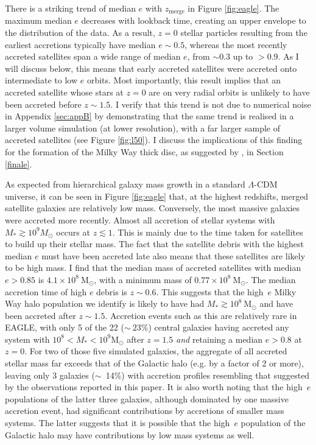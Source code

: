 There is a striking trend of median $e$ with $z_{\mathrm{merge}}$
in Figure \ref{fig:eagle}. The maximum median $e$ decreases with
lookback time, creating an upper envelope to the distribution of
the data.  As a result, $z=0$ stellar particles resulting from the
earliest accretions typically have median $e\sim0.5$, whereas the
most recently accreted satellites span a wide range of median
$e$, from $\sim 0.3$ up to $> 0.9$.  As I will discuss below, this means
that early accreted satellites were accreted onto intermediate to
low $e$ orbits.  Most importantly, this result implies that 
an accreted satellite whose stars at $z=0$ are on very radial orbits is
unlikely to have been accreted before $z\sim1.5$. I
verify that this trend is not due to numerical noise in Appendix
\ref{sec:appB} by demonstrating that the same trend is realised
in a larger volume simulation (at lower resolution), with a far
larger sample of accreted satellites (see Figure \ref{fig:l50}). I
discuss the implications of this finding for the formation of the
Milky Way thick disc, as suggested by \citet{2018arXiv180606038H},
in Section \ref{finale}.

As expected from hierarchical galaxy mass growth in a
standard $\Lambda$-CDM universe, it can be seen in Figure \ref{fig:eagle}
that, at the highest redshifts, merged satellite galaxies are
relatively low mass.  Conversely, the most massive galaxies
were accreted more recently.  Almost all accretion of stellar systems
with $M_* \gtrsim 10^9 M_\odot$ occurs at $z \lesssim 1$.
This is mainly due to the time taken for satellites to build up
their stellar mass. The fact that the satellite debris with the
highest median $e$ must have been accreted late also means that
these satellites are likely to be high mass. I find that the median
mass of accreted satellites with median $e>0.85$ is $4.1\times
10^{8}\ \mathrm{M_{\odot}}$, with a minimum mass of $0.77 \times
10^{8}\ \mathrm{M_{\odot}}$. The median accretion time of high $e$
debris is $z \sim 0.6$. This suggests that the high~$e$ Milky Way
halo population we identify is likely to have had  $M_* \gtrsim
10^{8}\ \mathrm{M_{\odot}}$ and have been accreted after $z\sim
1.5$.  Accretion events such as this are relatively rare in EAGLE,
with only 5 of the 22 ($\sim~23\%$) central galaxies having accreted
any system with $10^8 < M_* < 10^9 \mathrm{M_{\odot}}$ after $z=1.5$
\emph{and} retaining a median $e > 0.8$ at $z=0$.  For two of those
five simulated galaxies, the aggregate of all accreted stellar mass
far exceeds that of the Galactic halo (e.g. by a factor of 2 or
more), leaving only 3 galaxies ($\sim$~14\%) with accretion profiles
resembling that suggested by the observations reported in this
paper.  It is also worth noting that the high~$e$ populations of
the latter three galaxies, although dominated by one massive accretion
event, had significant contributions by accretions of smaller
mass systems.  The latter suggests that it is possible that the
high~$e$ population of the Galactic halo may have contributions by
low mass systems as well. 

